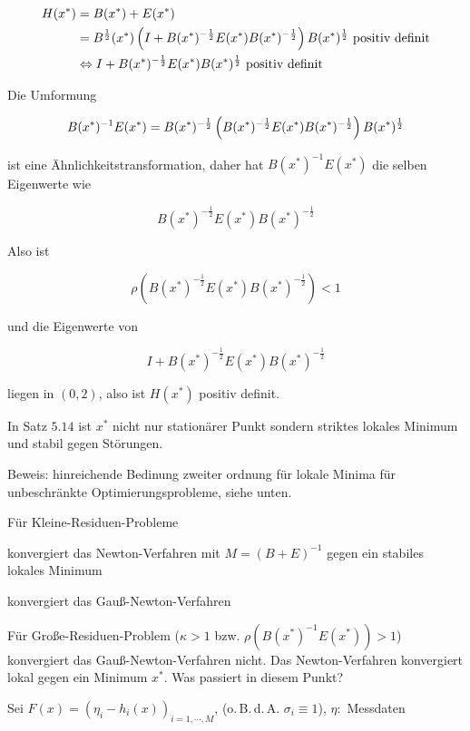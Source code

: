 \begin{align*}
 H(x^*) &= B(x^*) + E(x^*) \\
&= B^{\frac 12} (x^*) \left(I + B(x^*)^{-\frac 12} E(x^*)  B(x^*)^{-\frac 12} \right) B(x^*)^{\frac 12} \text{ positiv definit} \\
&\Leftrightarrow I + B(x^*)^{-\frac 12} E(x^*) B(x^*)^{\frac 12} \text{ positiv definit} \\
 \end{align*}

Die Umformung

\[B(x^*)^{-1} E(x^*) = B(x^*)^{-\frac 12} \left(B(x^*)^{-\frac 12} E(x^*) B(x^*)^{-\frac 12} \right) B(x^*)^{\frac 12} \]

ist eine Ähnlichkeitstransformation, daher hat $B(x^*)^{-1} E(x^*)$ die selben Eigenwerte wie

\[ B(x^*)^{-\frac 12} E(x^*) B(x^*)^{-\frac 12} \]

Also ist

\[ \rho (B(x^*)^{-\frac 12} E(x^*) B(x^*)^{-\frac 12} ) < 1 \]

und die Eigenwerte von

\[ I + B(x^*)^{-\frac 12} E(x^*) B(x^*)^{-\frac 12} \]

liegen in $(0,2)$, also ist $H(x^*)$ positiv definit.


In Satz $5.14$ ist $x^*$ nicht nur stationärer Punkt sondern striktes lokales Minimum und stabil gegen Störungen.

Beweis: hinreichende Bedinung zweiter ordnung für lokale Minima für unbeschränkte Optimierungsprobleme, siehe unten.


Für Kleine-Residuen-Probleme

\bitm
\item konvergiert das Newton-Verfahren mit $M = (B+E)^{-1}$ gegen ein stabiles lokales Minimum 
\item konvergiert das Gauß-Newton-Verfahren
\eitm

Für Große-Residuen-Problem ($\kappa>1$ bzw. $\rho (B(x^*)^{-1} E(x^*)) > 1$) konvergiert das Gauß-Newton-Verfahren nicht. Das Newton-Verfahren konvergiert lokal gegen ein Minimum $x^*$. Was passiert in diesem Punkt?


Sei $F(x) = ( \eta_i - h_i(x))_{i=1,\cdots,M}$, (o.\,B.\,d.\,A. $\sigma_i \equiv 1$), $\eta:$ Messdaten

